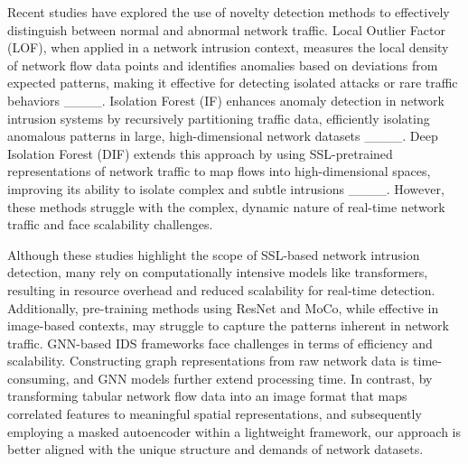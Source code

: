 Recent studies have explored the use of novelty detection methods to effectively distinguish between normal and abnormal network traffic. Local Outlier Factor (LOF), when applied in a network intrusion context, measures the local density of network flow data points and identifies anomalies based on deviations from expected patterns, making it effective for detecting isolated attacks or rare traffic behaviors ____. Isolation Forest (IF) enhances anomaly detection in network intrusion systems by recursively partitioning traffic data, efficiently isolating anomalous patterns in large, high-dimensional network datasets ____. Deep Isolation Forest (DIF) extends this approach by using SSL-pretrained representations of network traffic to map flows into high-dimensional spaces, improving its ability to isolate complex and subtle intrusions ____. However, these methods struggle with the complex, dynamic nature of real-time network traffic and face scalability challenges.  

Although these studies highlight the scope of SSL-based network intrusion detection, many rely on computationally intensive models like transformers, resulting in resource overhead and reduced scalability for real-time detection. Additionally, pre-training methods using ResNet and MoCo, while effective in image-based contexts, may struggle to capture the patterns inherent in network traffic. GNN-based IDS frameworks face challenges in terms of efficiency and scalability. Constructing graph representations from raw network data is time-consuming, and GNN models further extend processing time. In contrast, by transforming tabular network flow data into an image format that maps correlated features to meaningful spatial representations, and subsequently employing a masked autoencoder within a lightweight framework, our approach is better aligned with the unique structure and demands of network datasets. 
